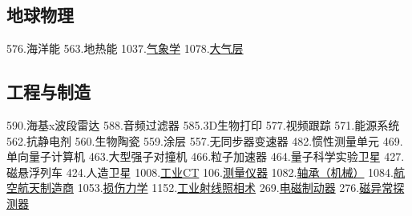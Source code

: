 \subsection{地球物理}
576.海洋能
563.地热能
1037.\href{https://wuli.wiki/assets/sogou/1037.\%E6\%B0\%94\%E8\%B1\%A1\%E5\%AD\%A6\%20-\%20\%E6\%90\%9C\%E7\%8B\%97\%E7\%A7\%91\%E5\%AD\%A6\%E7\%99\%BE\%E7\%A7\%91.html}{气象学}
1078.\href{https://wuli.wiki/assets/sogou/1078.\%E5\%A4\%A7\%E6\%B0\%94\%E5\%B1\%82\%20-\%20\%E6\%90\%9C\%E7\%8B\%97\%E7\%A7\%91\%E5\%AD\%A6\%E7\%99\%BE\%E7\%A7\%91.html}{大气层}

\subsection{工程与制造}
590.海基x波段雷达
588.音频过滤器
585.3D生物打印
577.视频跟踪
571.能源系统
562.抗静电剂
560.生物陶瓷
559.涂层
557.无同步器变速器
482.惯性测量单元
469.单向量子计算机
463.大型强子对撞机
466.粒子加速器
464.量子科学实验卫星
427.磁悬浮列车
424.人造卫星
1008.\href{https://wuli.wiki/assets/sogou/1008.\%E5\%B7\%A5\%E4\%B8\%9ACT\%20-\%20\%E6\%90\%9C\%E7\%8B\%97\%E7\%A7\%91\%E5\%AD\%A6\%E7\%99\%BE\%E7\%A7\%91.html}{工业CT}
106.\href{https://wuli.wiki/assets/sogou/106.\%E6\%B5\%8B\%E9\%87\%8F\%E4\%BB\%AA\%E5\%99\%A8\%20-\%20\%E6\%90\%9C\%E7\%8B\%97\%E7\%A7\%91\%E5\%AD\%A6\%E7\%99\%BE\%E7\%A7\%91.html}{测量仪器}
1082.\href{https://wuli.wiki/assets/sogou/1082.\%E8\%BD\%B4\%E6\%89\%BF\%EF\%BC\%88\%E6\%9C\%BA\%E6\%A2\%B0\%EF\%BC\%89\%20-\%20\%E6\%90\%9C\%E7\%8B\%97\%E7\%A7\%91\%E5\%AD\%A6\%E7\%99\%BE\%E7\%A7\%91.html}{轴承（机械）}
1084.\href{https://wuli.wiki/assets/sogou/1084.\%E8\%88\%AA\%E7\%A9\%BA\%E8\%88\%AA\%E5\%A4\%A9\%E5\%88\%B6\%E9\%80\%A0\%E5\%95\%86\%20-\%20\%E6\%90\%9C\%E7\%8B\%97\%E7\%A7\%91\%E5\%AD\%A6\%E7\%99\%BE\%E7\%A7\%91.html}{航空航天制造商}
1053.\href{https://wuli.wiki/assets/sogou/1053.\%E6\%8D\%9F\%E4\%BC\%A4\%E5\%8A\%9B\%E5\%AD\%A6\%20-\%20\%E6\%90\%9C\%E7\%8B\%97\%E7\%A7\%91\%E5\%AD\%A6\%E7\%99\%BE\%E7\%A7\%91.html}{损伤力学}
1152.\href{https://wuli.wiki/assets/sogou/1152.\%E5\%B7\%A5\%E4\%B8\%9A\%E5\%B0\%84\%E7\%BA\%BF\%E7\%85\%A7\%E7\%9B\%B8\%E6\%9C\%AF\%20-\%20\%E6\%90\%9C\%E7\%8B\%97\%E7\%A7\%91\%E5\%AD\%A6\%E7\%99\%BE\%E7\%A7\%91.html}{工业射线照相术}
269.\href{https://wuli.wiki/assets/sogou/269.\%E7\%94\%B5\%E7\%A3\%81\%E5\%88\%B6\%E5\%8A\%A8\%E5\%99\%A8\%20-\%20\%E6\%90\%9C\%E7\%8B\%97\%E7\%A7\%91\%E5\%AD\%A6\%E7\%99\%BE\%E7\%A7\%91.html}{电磁制动器}
276.\href{https://wuli.wiki/assets/sogou/276.\%E7\%A3\%81\%E5\%BC\%82\%E5\%B8\%B8\%E6\%8E\%A2\%E6\%B5\%8B\%E5\%99\%A8\%20-\%20\%E6\%90\%9C\%E7\%8B\%97\%E7\%A7\%91\%E5\%AD\%A6\%E7\%99\%BE\%E7\%A7\%91.html}{磁异常探测器}
